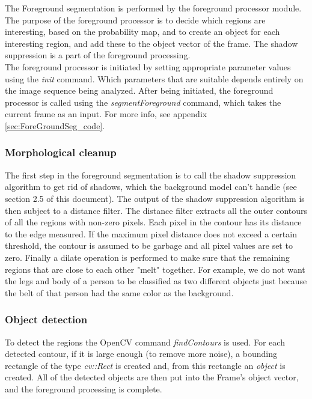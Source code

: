 The Foreground segmentation is performed by the foreground processor module. The purpose of the foreground processor is to decide which regions are interesting, based on the probability map, and to create an object for each interesting region, and add these to the object vector of the frame. The shadow suppression is a part of the foreground processing. \\
\newline
The foreground processor is initiated by setting appropriate parameter values using the \emph{init} command. Which parameters that are suitable depends entirely on the image sequence being analyzed. After being initiated, the foreground processor is called using the \emph{segmentForeground} command, which takes the current frame as an input. For more info, see appendix \ref{sec:ForeGroundSeg_code}.

\subsubsection{Morphological cleanup}
The first step in the foreground segmentation is to call the shadow suppression algorithm to get rid of shadows, which the background model can't handle (see section 2.5 of this document). The output of the shadow suppression algorithm is then subject to a distance filter. The distance filter extracts all the outer contours of all the regions with non-zero pixels. Each pixel in the contour has its distance to the edge measured. If the maximum pixel distance does not exceed a certain threshold, the contour is assumed to be garbage and all pixel values are set to zero. Finally a dilate operation is performed to make sure that the remaining regions that are close to each other "melt" together. For example, we do not want the legs and body of a person to be classified as two different objects just because the belt of that person had the same color as the background. 


\subsubsection{Object detection}
To detect the regions the OpenCV command \emph{findContours} is used. For each detected contour, if it is large enough (to remove more noise), a bounding rectangle of the type \emph{cv::Rect} is created and, from this rectangle an \emph{object} is created. All of the detected objects are then put into the Frame's object vector, and the foreground processing is complete.

